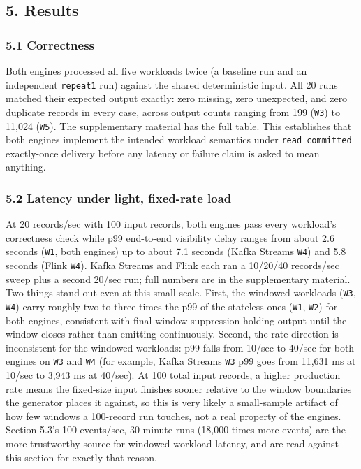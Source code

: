 \documentclass[
]{article}
\begin{document}
\hypertarget{results}{%
\subsection{5. Results}\label{results}}

\hypertarget{correctness}{%
\subsubsection{5.1 Correctness}\label{correctness}}

Both engines processed all five workloads twice (a baseline run and an
independent \texttt{repeat1} run) against the shared deterministic
input. All 20 runs matched their expected output exactly: zero missing,
zero unexpected, and zero duplicate records in every case, across output
counts ranging from 199 (\texttt{W3}) to 11,024 (\texttt{W5}). The
supplementary material has the full table. This establishes that both
engines implement the intended workload semantics under
\texttt{read\_committed} exactly-once delivery before any latency or
failure claim is asked to mean anything.

\hypertarget{latency-under-light-fixed-rate-load}{%
\subsubsection{5.2 Latency under light, fixed-rate
load}\label{latency-under-light-fixed-rate-load}}

At 20 records/sec with 100 input records, both engines pass every
workload's correctness check while p99 end-to-end visibility delay
ranges from about 2.6 seconds (\texttt{W1}, both engines) up to about
7.1 seconds (Kafka Streams \texttt{W4}) and 5.8 seconds (Flink
\texttt{W4}). Kafka Streams and Flink each ran a 10/20/40 records/sec
sweep plus a second 20/sec run; full numbers are in the supplementary
material. Two things stand out even at this small scale. First, the
windowed workloads (\texttt{W3}, \texttt{W4}) carry roughly two to three
times the p99 of the stateless ones (\texttt{W1}, \texttt{W2}) for both
engines, consistent with final-window suppression holding output until
the window closes rather than emitting continuously. Second, the rate
direction is inconsistent for the windowed workloads: p99 falls from
10/sec to 40/sec for both engines on \texttt{W3} and \texttt{W4} (for
example, Kafka Streams \texttt{W3} p99 goes from 11,631 ms at 10/sec to
3,943 ms at 40/sec). At 100 total input records, a higher production
rate means the fixed-size input finishes sooner relative to the window
boundaries the generator places it against, so this is very likely a
small-sample artifact of how few windows a 100-record run touches, not a
real property of the engines. Section 5.3's 100 events/sec, 30-minute
runs (18,000 times more events) are the more trustworthy source for
windowed-workload latency, and are read against this section for exactly
that reason.
\end{document}
